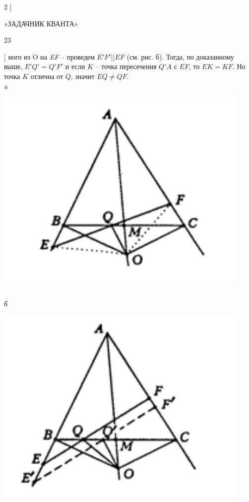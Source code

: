 \documentclass{article}
\begin{document}
\begin{multicols}{2}
[
\begin{center}
«З\;А\;Д\;А\;Ч\;Н\;И\;К\; К\;В\;А\;Н\;Т\;А»\begin{flushright}23\end{flushright}
\end{center}
]
ного из O на \textit{EF} -- проведем $E'F'$||$EF$ (см. рис. б). Тогда, по доказанному выше, $E'Q' = Q'F'$ и если $K$ -- точка пересечения $Q'A$ с $EF$, то $EK = KF$. Но точка $K$ отлична от $Q$, значит $EQ \neq QF$.\\
\textit{a}\begin{center}\includegraphics[scale=0.2]{1.png}\end{center}\\
\textit{б}\begin{center}\includegraphics[scale=0.2]{2.png}\end{center}\\

\end{multicols}
\end{document}
